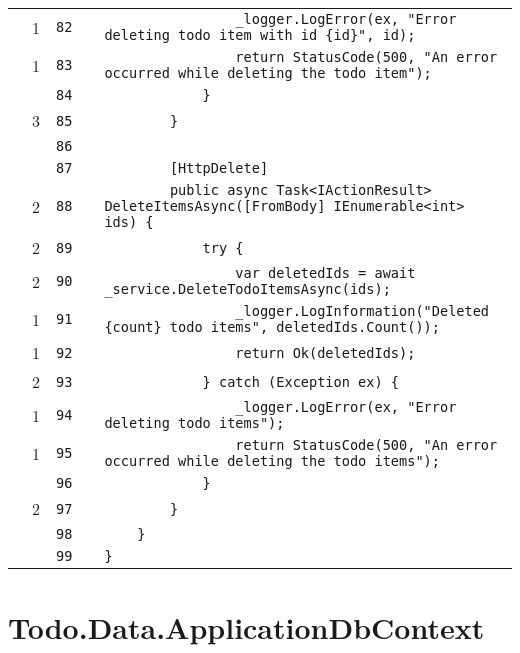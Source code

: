 \documentclass[a4paper,landscape,10pt]{article}
\begin{document}
\begin{longtable}[l]{lrrll}
\cellcolor{green} & 1 & \verb~82~ & & \verb~                _logger.LogError(ex, "Error deleting todo item with id {id}", id);~\\
\cellcolor{green} & 1 & \verb~83~ & & \verb~                return StatusCode(500, "An error occurred while deleting the todo item");~\\
\cellcolor{gray} &  & \verb~84~ & & \verb~            }~\\
\cellcolor{green} & 3 & \verb~85~ & & \verb~        }~\\
\cellcolor{gray} &  & \verb~86~ & & \verb~~\\
\cellcolor{gray} &  & \verb~87~ & & \verb~        [HttpDelete]~\\
\cellcolor{green} & 2 & \verb~88~ & & \verb~        public async Task<IActionResult> DeleteItemsAsync([FromBody] IEnumerable<int> ids) {~\\
\cellcolor{green} & 2 & \verb~89~ & & \verb~            try {~\\
\cellcolor{green} & 2 & \verb~90~ & & \verb~                var deletedIds = await _service.DeleteTodoItemsAsync(ids);~\\
\cellcolor{green} & 1 & \verb~91~ & & \verb~                _logger.LogInformation("Deleted {count} todo items", deletedIds.Count());~\\
\cellcolor{green} & 1 & \verb~92~ & & \verb~                return Ok(deletedIds);~\\
\cellcolor{green} & 2 & \verb~93~ & & \verb~            } catch (Exception ex) {~\\
\cellcolor{green} & 1 & \verb~94~ & & \verb~                _logger.LogError(ex, "Error deleting todo items");~\\
\cellcolor{green} & 1 & \verb~95~ & & \verb~                return StatusCode(500, "An error occurred while deleting the todo items");~\\
\cellcolor{gray} &  & \verb~96~ & & \verb~            }~\\
\cellcolor{green} & 2 & \verb~97~ & & \verb~        }~\\
\cellcolor{gray} &  & \verb~98~ & & \verb~    }~\\
\cellcolor{gray} &  & \verb~99~ & & \verb~}~\\
\end{longtable}
\newpage
\section{Todo.Data.ApplicationDbContext}
\end{document}
